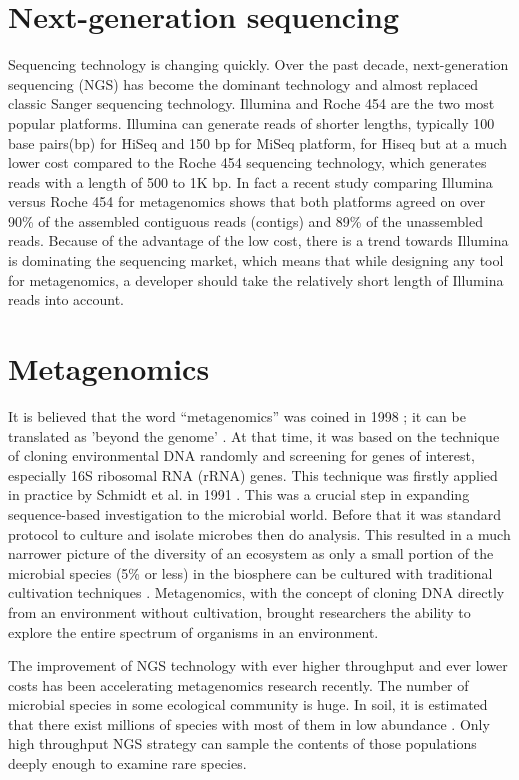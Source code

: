 \section{Next-generation sequencing} Sequencing technology is changing quickly.
Over the past decade, next-generation sequencing (NGS) has become the dominant
technology and almost replaced classic Sanger sequencing technology. Illumina
and Roche 454 are the two most popular platforms. Illumina can generate reads
of shorter lengths, typically 100 base pairs(bp) for HiSeq and 150 bp for MiSeq
platform\cite{Qin:2010aa, Mason:2012aa},   %
for Hiseq but at a much lower cost compared to the Roche 454 sequencing
technology, which generates reads with a length of 500 to 1K bp. In fact a
recent study comparing Illumina versus Roche 454 for metagenomics shows that
both platforms agreed on over 90\% of the assembled contiguous reads (contigs)
and 89\% of the unassembled reads\cite{Luo:2012aa}. Because of the advantage of
the low cost, there is a trend towards Illumina is dominating the sequencing
market, which means that while designing any tool for metagenomics, a developer
should take the relatively short length of Illumina reads into account.


\section{Metagenomics} It is believed that the word ``metagenomics'' was coined
in 1998 \cite{Handelsman:1998aa}; it can be translated as 'beyond the genome'
\cite{Gilbert:2011aa}. At that time, it was based on the technique of cloning
environmental DNA randomly and screening for genes of interest, especially 16S
ribosomal RNA (rRNA) genes. This technique was firstly applied in practice by
Schmidt et al. in 1991 \cite{Schmidt:1991aa}. This was a crucial step in
expanding sequence-based investigation to the microbial world. Before that it
was standard protocol to culture and isolate microbes then do analysis. This
resulted in a much narrower picture of the diversity of an ecosystem as only a
small portion of the microbial species (5\% or less) in the biosphere can be
cultured with traditional cultivation techniques \cite{Sogin:2006aa}.
Metagenomics, with the concept of cloning DNA directly from an environment
without cultivation, brought researchers the ability to explore the entire
spectrum of organisms in an environment.

The improvement of NGS technology with ever higher throughput and ever lower
costs has been accelerating metagenomics research recently. %
The number of microbial species in some ecological community is huge. In soil,
it is estimated that there exist millions of species with most of them in low
abundance \cite{Gans:2005aa}. Only high throughput NGS strategy can sample the
contents of those populations deeply enough to examine rare species.

